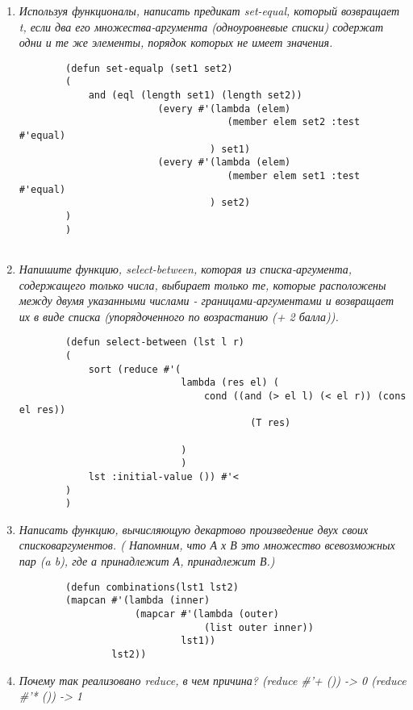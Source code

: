 \begin{enumerate}[wide=0pt]
	\begin{lstlisting}
		(defun polyp (lst) (
			cond ((eql 
				(find-if-not #'oddp

					(mapcar #'(
						lambda (elem revelem) (
							cond 
								((eql elem revelem) 1)
								(T 0)
						)
						) lst (reverse lst)
					)
				)
				Nil) '(T))
				(T Nil)
		)
		)
	\end{lstlisting}


	\item  \textit{Используя функционалы, написать предикат set-equal, который возвращает t, если два
	его множества-аргумента (одноуровневые списки) содержат одни и те же элементы,
	порядок которых не имеет значения.}
	
	\begin{lstlisting}
		(defun set-equalp (set1 set2)
		(
			and (eql (length set1) (length set2))
						(every #'(lambda (elem) 
									(member elem set2 :test #'equal)
								 ) set1)
						(every #'(lambda (elem) 
									(member elem set1 :test #'equal)
								 ) set2)
		)
		)
		
	\end{lstlisting}

	\item  \textit{Напишите функцию, select-between, которая из списка-аргумента, содержащего только
	числа, выбирает только те, которые расположены между двумя указанными числами -
	границами-аргументами и возвращает их в виде списка (упорядоченного по
	возрастанию (+ 2 балла)).}

	\begin{lstlisting}
		(defun select-between (lst l r)
		(
			sort (reduce #'(
							lambda (res el) (
								cond ((and (> el l) (< el r)) (cons el res))
										(T res)
				
							)
							)
			lst :initial-value ()) #'<
		)
		)

	\end{lstlisting}

	\item  \textit{Написать функцию, вычисляющую декартово произведение двух своих списковаргументов. ( Напомним, что А х В это множество всевозможных пар (a b), где а
	принадлежит А, принадлежит В.)}
	\begin{lstlisting}
		(defun combinations(lst1 lst2)
		(mapcan #'(lambda (inner)
					(mapcar #'(lambda (outer)
								(list outer inner)) 
							lst1)) 
				lst2))
	\end{lstlisting}

	\item  \textit{Почему так реализовано reduce, в чем причина?
	(reduce \#'+ ()) -> 0 (reduce \#'* ()) -> 1}
	

\end{enumerate}
